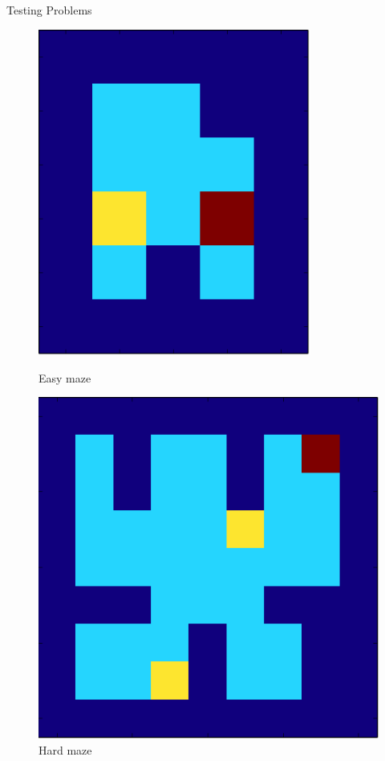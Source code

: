 \documentclass{beamer}
\begin{document}
\begin{frame}{Testing Problems}
\begin{figure}
\begin{minipage}{0.3\textwidth}
\centering
\includegraphics[width=0.8\textwidth]{easymaze.png}
\caption{Easy maze}
\end{minipage}%
\hspace{1cm}
\begin{minipage}{0.3\textwidth}
\centering
\includegraphics[width=\textwidth]{hardmaze.png}
\caption{Hard maze}
\end{minipage}%
\end{figure}
\end{frame}
\end{document}
